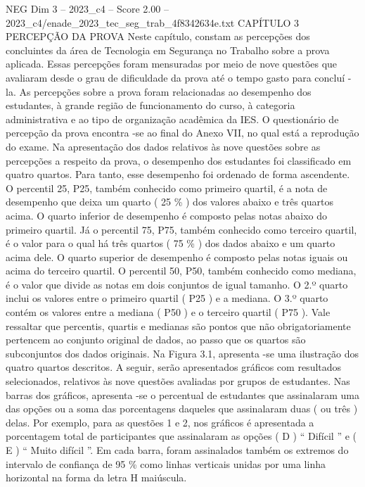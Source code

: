 \begin{textsample}{NEG Dim 3 – 2023\_c4 – Score 2.00 – 2023\_c4/enade\_2023\_tec\_seg\_trab\_4f8342634e.txt}  \label{ex:f3_neg_211}
CAPÍTULO 3 PERCEPÇÃO DA PROVA Neste capítulo, constam as percepções dos concluintes da área de Tecnologia em Segurança no Trabalho sobre a prova aplicada.
Essas percepções foram mensuradas por meio de nove questões que avaliaram desde o grau de dificuldade da prova até o tempo gasto para concluí -la.
As percepções sobre a prova foram relacionadas ao desempenho dos estudantes, à grande região de funcionamento do curso, à categoria administrativa e ao tipo de organização acadêmica da IES.
O questionário de percepção da prova encontra -se ao final do Anexo VII, no qual está a reprodução do exame.
Na apresentação dos dados relativos às nove questões sobre as percepções a respeito da prova, o desempenho dos estudantes foi classificado em quatro quartos.
Para tanto, esse desempenho foi ordenado de forma ascendente.
O percentil 25, P25, também conhecido como primeiro quartil, é a nota de desempenho que deixa um quarto ( 25 \% ) dos valores abaixo e três quartos acima.
O quarto inferior de desempenho é composto pelas notas abaixo do primeiro quartil.
Já o percentil 75, P75, também conhecido como terceiro quartil, é o valor para o qual há três quartos ( 75 \% ) dos dados abaixo e um quarto acima dele.
O quarto superior de desempenho é composto pelas notas iguais ou acima do terceiro quartil.
O percentil 50, P50, também conhecido como mediana, é o valor que divide as notas em dois conjuntos de igual tamanho.
O 2.º quarto inclui os valores entre o primeiro quartil ( P25 ) e a mediana.
O 3.º quarto contém os valores entre a mediana ( P50 ) e o terceiro quartil ( P75 ).
Vale ressaltar que percentis, quartis e medianas são pontos que não obrigatoriamente pertencem ao conjunto original de dados, ao passo que os quartos são subconjuntos dos dados originais.
Na Figura 3.1, apresenta -se uma ilustração dos quatro quartos descritos.
A seguir, serão apresentados gráficos com resultados selecionados, relativos às nove questões avaliadas por grupos de estudantes.
Nas barras dos gráficos, apresenta -se o percentual de estudantes que assinalaram uma das opções ou a soma das porcentagens daqueles que assinalaram duas ( ou três ) delas.
Por exemplo, para as questões 1 e 2, nos gráficos é apresentada a porcentagem total de participantes que assinalaram as opções ( D ) “ Difícil ” e ( E ) “ Muito difícil ”.
Em cada barra, foram assinalados também os extremos do intervalo de confiança de 95 \% como linhas verticais unidas por uma linha horizontal na forma da letra H maiúscula.

\end{textsample}
